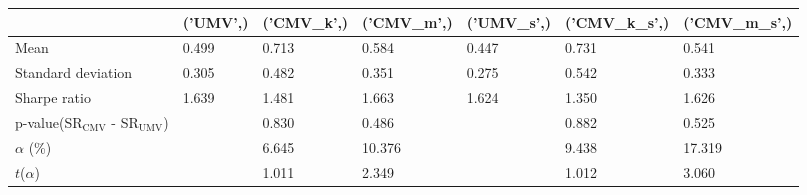 \begin{tabular}{lllllll}
\toprule
 & ('UMV',) & ('CMV_k',) & ('CMV_m',) & ('UMV_s',) & ('CMV_k_s',) & ('CMV_m_s',) \\
\midrule
Mean & 0.499 & 0.713 & 0.584 & 0.447 & 0.731 & 0.541 \\
Standard deviation & 0.305 & 0.482 & 0.351 & 0.275 & 0.542 & 0.333 \\
Sharpe ratio & 1.639 & 1.481 & 1.663 & 1.624 & 1.350 & 1.626 \\
p-value(SR$_{\text{CMV}}$ - SR$_{\text{UMV}}$) &  & 0.830 & 0.486 &  & 0.882 & 0.525 \\
$\alpha$ (\%) &  & 6.645 & 10.376 &  & 9.438 & 17.319 \\
$t$($\alpha$) &  & 1.011 & 2.349 &  & 1.012 & 3.060 \\
\bottomrule
\end{tabular}
